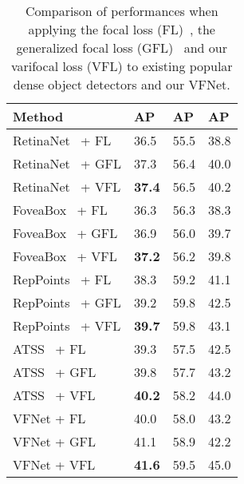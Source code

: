 \begin{table}[t]
    \begin{center}
        \begin{tabular}{ K{12em}  | K{3em} K{3em} K{3em} }
            \hline
             Method  & AP &  AP &  AP \\
            \hline
             RetinaNet~\cite{retinaNet} + FL  & 36.5 & 55.5 & 38.8  \\ 
             RetinaNet~\cite{retinaNet} + GFL & 37.3 & 56.4 & 40.0  \\ 
             RetinaNet~\cite{retinaNet} + VFL & \textbf{37.4} & 56.5 & 40.2  \\ 
             \hline
             FoveaBox~\cite{foveaBox} + FL  & 36.3 & 56.3 & 38.3  \\ 
             FoveaBox~\cite{foveaBox} + GFL & 36.9 & 56.0 & 39.7  \\ 
             FoveaBox~\cite{foveaBox} + VFL & \textbf{37.2} & 56.2 & 39.8  \\
             \hline
             RepPoints~\cite{repPoints} + FL  & 38.3 & 59.2 & 41.1  \\ 
             RepPoints~\cite{repPoints} + GFL & 39.2 & 59.8 & 42.5 \\ 
             RepPoints~\cite{repPoints} + VFL & \textbf{39.7} & 59.8 & 43.1  \\ 
             \hline
             ATSS~\cite{ATSS} + FL & 39.3 & 57.5 & 42.5 \\
             ATSS~\cite{ATSS} + GFL & 39.8 & 57.7 & 43.2 \\
             ATSS~\cite{ATSS} + VFL & \textbf{40.2} & 58.2 & 44.0 \\
             \hline
             VFNet + FL  & 40.0 & 58.0 & 43.2 \\ 
             VFNet + GFL & 41.1 & 58.9 & 42.2 \\ 
             VFNet + VFL & \textbf{41.6} & 59.5 & 45.0 \\ 
            \hline
        \end{tabular}
    \end{center}
    \vspace{-5mm}
\caption{Comparison of performances when applying the focal loss (FL)~\cite{retinaNet}, the generalized focal loss (GFL)~\cite{GFL} and our varifocal loss (VFL) to existing popular dense object detectors and our VFNet.}
\label{table:existing}
\vspace{-4mm}
\end{table}

